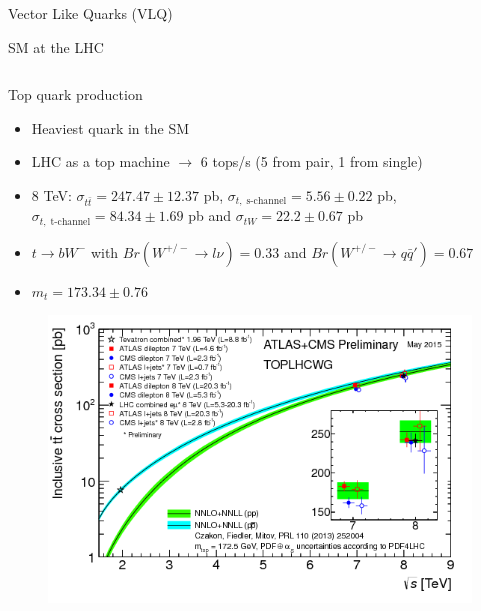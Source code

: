 \begin{frame}{Vector Like Quarks (VLQ)}
\end{frame}

\begin{frame}{SM at the LHC}
\vspace{-.3cm}
\begin{columns}

\begin{column}{.50\textwidth}
\begin{block}{Top quark production}
\begin{itemize}\tiny
\item Heaviest quark in the SM 
\item LHC as a top machine $\to$ 6 tops/s (5 from pair, 1 from single)
\item 8 TeV: $\sigma_{t\bar{t}}=247.47\pm12.37$ pb, $\sigma_{t,\; \text{s-channel}}=5.56\pm0.22$ pb, $\sigma_{t,\; \text{t-channel}}=84.34\pm1.69$ pb and $\sigma_{tW}=22.2\pm0.67$ pb
\item $t\to bW^{-}$ with $Br(W^{+/-}\to l\nu)=0.33$ and $Br(W^{+/-}\to q\bar{q}')=0.67$
\item $m_{t}=173.34\pm 0.76$ \GeVcc
\end{itemize}
\end{block}

\vspace{-.4cm}
\begin{figure}[!Hhtbp]
  \begin{center}
    \includegraphics[width=1.0\textwidth]{../figs/toplhcwg_ttxsec_sqrts_may2015.png}
  \end{center}
\end{figure}
\end{column}


\end{columns}
\end{frame}
